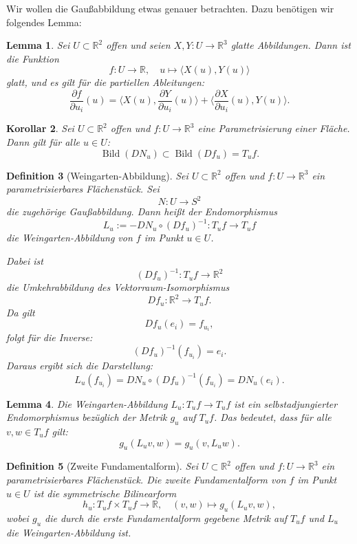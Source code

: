 \documentclass[a4paper,12pt]{article}
\theoremstyle{break}
\newtheorem{definition}{Definition}[section]
\newtheorem{lemma}[definition]{Lemma}
\newtheorem{corollary}[definition]{Korollar}
\begin{document}
Wir wollen die Gaußabbildung etwas genauer betrachten. Dazu benötigen wir folgendes Lemma:

\begin{lemma}
Sei $U \subset \mathbb{R}^2$ offen und seien $X, Y: U \to \mathbb{R}^3$ glatte Abbildungen. Dann ist die Funktion
\[
f: U \to \mathbb{R}, \quad u \mapsto \langle X(u), Y(u) \rangle
\]
glatt, und es gilt für die partiellen Ableitungen:
\[
\frac{\partial f}{\partial u_i} (u) = \langle X(u), \frac{\partial Y}{\partial u_i} (u) \rangle + \langle \frac{\partial X}{\partial u_i} (u), Y(u) \rangle.
\]
\end{lemma}

\begin{corollary}
Sei $U \subset \mathbb{R}^2$ offen und $f: U \to \mathbb{R}^3$ eine Parametrisierung einer Fläche. Dann gilt für alle $u \in U$:
\[
\operatorname{Bild}(D N_u) \subset \operatorname{Bild}(D f_u) = T_u f.
\]
\end{corollary}

\begin{definition}[Weingarten-Abbildung]
Sei $U \subset \mathbb{R}^2$ offen und $f: U \to \mathbb{R}^3$ ein parametrisierbares Flächenstück. Sei  
\[
N: U \to S^2
\]
die zugehörige Gaußabbildung. Dann heißt der Endomorphismus  
\[
L_u := - D N_u \circ (D f_u)^{-1}: T_u f \to T_u f
\]
die \emph{Weingarten-Abbildung} von $f$ im Punkt $u \in U$.

Dabei ist  
\[
(D f_u)^{-1}: T_u f \to \mathbb{R}^2
\]
die Umkehrabbildung des Vektorraum-Isomorphismus  
\[
D f_u: \mathbb{R}^2 \to T_u f.
\]
Da gilt  
\[
D f_u(e_i) = f_{u_i},
\]
folgt für die Inverse:  
\[
(D f_u)^{-1}(f_{u_i}) = e_i.
\]
Daraus ergibt sich die Darstellung:
\[
L_u (f_{u_i}) = D N_u \circ (D f_u)^{-1} (f_{u_i}) = D N_u (e_i).
\]
\end{definition}

\begin{lemma}
Die Weingarten-Abbildung $L_u: T_u f \to T_u f$ ist ein selbstadjungierter Endomorphismus bezüglich der Metrik $g_u$ auf $T_u f$. Das bedeutet, dass für alle $v, w \in T_u f$ gilt:
\[
g_u(L_u v, w) = g_u(v, L_u w).
\]
\end{lemma}

\begin{definition}[Zweite Fundamentalform]
Sei $U \subset \mathbb{R}^2$ offen und $f: U \to \mathbb{R}^3$ ein parametrisierbares Flächenstück. Die \emph{zweite Fundamentalform} von $f$ im Punkt $u \in U$ ist die symmetrische Bilinearform  
\[
h_u: T_u f \times T_u f \to \mathbb{R}, \quad (v,w) \mapsto g_u(L_u v, w),
\]
wobei $g_u$ die durch die erste Fundamentalform gegebene Metrik auf $T_u f$ und $L_u$ die Weingarten-Abbildung ist.
\end{definition}
\end{document}

